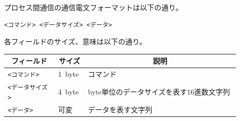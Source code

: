 \documentclass[twoside,11pt,fleqn]{book}
\begin{document}
プロセス間通信の通信電文フォーマットは以下の通り。
\begin{verbatim}
<コマンド> <データサイズ> <データ>
\end{verbatim}

各フィールドのサイズ、意味は以下の通り。
\begin{table}[!ht]
\footnotesize
\begin{tabular}{|p{0.20\linewidth}|p{0.10\linewidth}|p{0.60\linewidth}|} \hline
\multicolumn{1}{|c}{\textbf{フィールド}}&\multicolumn{1}{|c|}{\textbf{サイズ}}&\multicolumn{1}{c|}{\textbf{説明}}\\ \hline 
 \hline
\texttt{<コマンド>}&1~byte&コマンド\\ \hline
\texttt{<データサイズ>}&4~byte&byte単位のデータサイズを表す16進数文字列\\ \hline
\texttt{<データ>}&可変&データを表す文字列\\ \hline
\end{tabular}
\vspace{-0em}
\end{table}
\FloatBarrier
\end{document}
